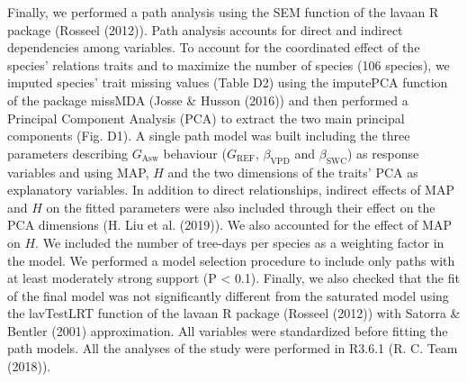 \documentclass[11pt,twoside]{reedthesis}
\begin{document}
Finally, we performed a path analysis using the SEM function of the
lavaan R package (Rosseel (2012)). Path analysis accounts for direct and
indirect dependencies among variables. To account for the coordinated
effect of the species' relations traits and to maximize the number of
species (106 species), we imputed species' trait missing values (Table
D2) using the imputePCA function of the package missMDA (Josse \& Husson
(2016)) and then performed a Principal Component Analysis (PCA) to
extract the two main principal components (Fig. D1). A single path model
was built including the three parameters describing \(G_{\text{Asw}}\)
behaviour (\(G_{\text{REF}}\), \(\beta_{\text{VPD}}\) and
\(\beta_{\text{SWC}}\)) as response variables and using MAP, \(H\) and
the two dimensions of the traits' PCA as explanatory variables. In
addition to direct relationships, indirect effects of MAP and \(H\) on
the fitted parameters were also included through their effect on the PCA
dimensions (H. Liu et al. (2019)). We also accounted for the effect of
MAP on \(H\). We included the number of tree-days per species as a
weighting factor in the model. We performed a model selection procedure
to include only paths with at least moderately strong support (P
\textless{} 0.1). Finally, we also checked that the fit of the final
model was not significantly different from the saturated model using the
lavTestLRT function of the lavaan R package (Rosseel (2012)) with
Satorra \& Bentler (2001) approximation. All variables were standardized
before fitting the path models. All the analyses of the study were
performed in R3.6.1 (R. C. Team (2018)).\par
\end{document}
